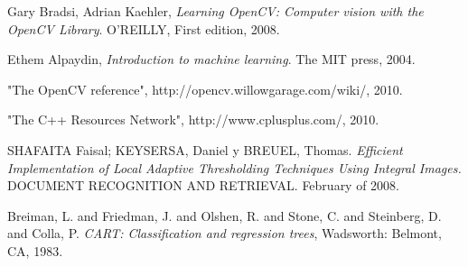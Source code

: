 \documentclass[10pt,journal]{IEEEtran}
\begin{document}
	\begin{thebibliography}{9}
	
			Gary Bradsi, Adrian Kaehler,
			\emph{Learning OpenCV: Computer vision with the OpenCV Library}.
			O'REILLY,
			First edition,
			2008.
			
			Ethem Alpaydin,
			\emph{Introduction to machine learning}.
			The MIT press,
			2004.
		
			"The OpenCV reference",
			http://opencv.willowgarage.com/wiki/,
			2010.
			
			"The C++ Resources Network",
			http://www.cplusplus.com/,
			2010.
			
			SHAFAITA Faisal; KEYSERSA, Daniel y BREUEL, Thomas. 
			\emph{Efficient Implementation of Local Adaptive Thresholding Techniques Using Integral Images.}
			DOCUMENT RECOGNITION AND RETRIEVAL. 
			February of 2008.
			
			Breiman, L. and Friedman, J. and Olshen, R. and Stone, C. and Steinberg, D. and Colla, P.
			\emph{CART: Classification and regression trees},
			Wadsworth: Belmont, CA,
			1983.
	\end{thebibliography}
	
\end{document}
